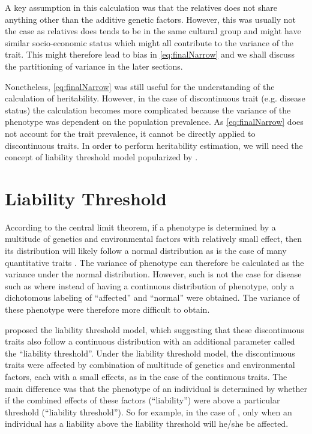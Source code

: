 	A key assumption in this calculation was that the relatives does not share anything other than the additive genetic factors.
	However, this was usually not the case as relatives does tends to be in the same cultural group and might have similar socio-economic status which might all contribute to the variance of the trait.
	This might therefore lead to bias in \cref{eq:finalNarrow} and we shall discuss the partitioning of variance in the later sections.
	
	Nonetheless, \cref{eq:finalNarrow} was still useful for the understanding of the calculation of heritability.
	However, in the case of discontinuous trait (e.g. disease status) the calculation becomes more complicated because the variance of the phenotype was dependent on the population prevalence.
	As \cref{eq:finalNarrow} does not account for the trait prevalence, it cannot be directly applied to discontinuous traits.
	In order to perform heritability estimation, we will need the concept of liability threshold model popularized by \cite{Falconer1965}.
	
	\section{Liability Threshold}
	\label{sec:liability}
	According to the central limit theorem, if a phenotype is determined by a multitude of genetics and environmental factors with relatively small effect, then its distribution will likely follow a normal distribution as is the case of many quantitative traits \citep{Visscher2008}. %
	The variance of phenotype can therefore be calculated as the variance under the normal distribution.
	However, such is not the case for disease such as  where instead of having a continuous distribution of phenotype, only a dichotomous labeling of ``affected'' and ``normal'' were obtained.
	The variance of these phenotype were therefore more difficult to obtain.
	
	\citet{Falconer1965} proposed the liability threshold model, which suggesting that these discontinuous traits also follow a continuous distribution with an additional parameter called the ``liability threshold''.
	Under the liability threshold model, the discontinuous traits were affected by combination of multitude of genetics and environmental factors, each with a small effects, as in the case of the continuous traits.
	The main difference was that the phenotype of an individual is determined by whether if the combined effects of these factors (``liability'') were above a particular threshold (``liability threshold'').
	So for example, in the case of , only when an individual has a liability above the liability threshold will he/she be affected.
	
